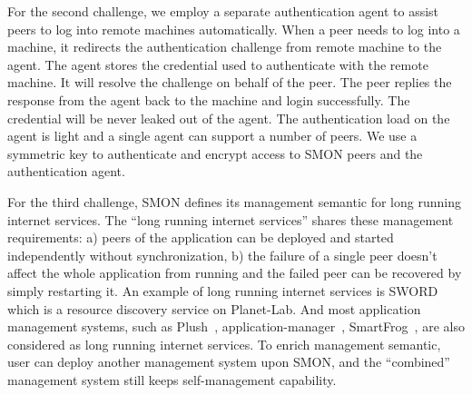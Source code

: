 For the second challenge, we employ a separate
authentication agent to assist peers to log into remote
machines automatically. When a peer needs to log into a
machine, it redirects the authentication challenge from
remote machine to the agent. The agent stores the credential
used to authenticate with the remote machine. It will
resolve the challenge on behalf of the peer. The peer
replies the response from the agent back to the machine and
login successfully. The credential will be never leaked out
of the agent. The authentication load on the agent is light
and a single agent can support a number of peers.  We use a
symmetric key to authenticate and encrypt access to SMON
peers and the authentication agent.

For the third challenge, SMON defines its management
semantic for long running internet services. The ``long
running internet services'' shares these management
requirements: a) peers of the application can be deployed
and started independently without synchronization, b) the
failure of a single peer doesn't affect the whole
application from running and the failed peer can be
recovered by simply restarting it. An example of long
running internet services is SWORD~\cite{sword_toit} which
is a resource discovery service on Planet-Lab.
And most application management systems, such as
Plush~\cite{Albrecht2007},
application-manager~\cite{appmanager},
SmartFrog~\cite{smartfrog}, are also considered as long
running internet services. To enrich management semantic,
user can deploy another management system upon SMON, and the
``combined'' management system still keeps self-management
capability.



